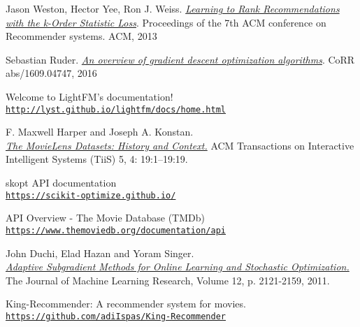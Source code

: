 \begin{thebibliography}{9}
	\hypertarget{jasonkos}{} 
	Jason Weston, Hector Yee, Ron J. Weiss.
	\textit{\href{https://static.googleusercontent.com/media/research.google.com/ro//pubs/archive/41534.pdf}{Learning to Rank Recommendations
with the k-Order Statistic Loss}}.
	Proceedings of the 7th ACM conference on Recommender systems. ACM, 2013
	
	\hypertarget{ruder2016}{} 
	Sebastian Ruder.
	\textit{\href{http://arxiv.org/abs/1609.04747}{An overview of gradient descent optimization algorithms}}.
	CoRR abs/1609.04747, 2016
	
	\hypertarget{lightfm}{} 
	Welcome to LightFM’s documentation!
	\\\texttt{\url{http://lyst.github.io/lightfm/docs/home.html}}
	
	\hypertarget{movielens}{} 
	F. Maxwell Harper and Joseph A. Konstan.
	\\\textit{\href{https://doi.org/10.1145/2827872}{The MovieLens Datasets: History and Context.}}
	ACM Transactions on Interactive Intelligent Systems (TiiS) 5, 4: 19:1–19:19.
	
	\hypertarget{skopt}{} 
	skopt API documentation
	\\\texttt{\url{https://scikit-optimize.github.io/}}
	
	\hypertarget{themoviedb}{} 
	API Overview - The Movie Database (TMDb)
	\\\texttt{\url{https://www.themoviedb.org/documentation/api}}
	
	\hypertarget{adagrad}{} 
	John Duchi, Elad Hazan and Yoram Singer.
	\\\textit{\href{http://jmlr.org/papers/v12/duchi11a.html}{Adaptive Subgradient Methods for Online Learning and Stochastic Optimization.}}
	The Journal of Machine Learning Research, Volume 12, p. 2121-2159, 2011.
	
	\hypertarget{kingrec}{} 
	King-Recommender: A recommender system for movies.
	\\\texttt{\url{https://github.com/adiIspas/King-Recommender}}
\end{thebibliography}
